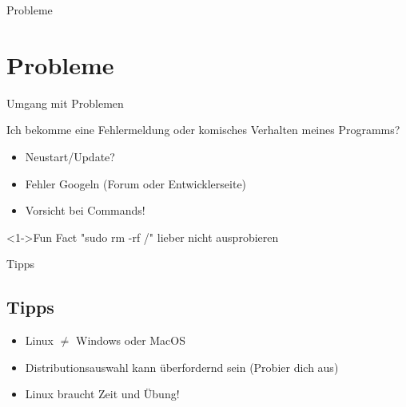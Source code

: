 
\begin{frame}{Probleme}
    \section{Probleme}\label{sec:probleme}

\end{frame}

\begin{frame}{Umgang mit Problemen}

    Ich bekomme eine Fehlermeldung oder komisches Verhalten meines Programms?

    \begin{itemize}
        \item<2-> Neustart/Update?
        \item<3-> Fehler Googeln (Forum oder Entwicklerseite)
        \item<4-> Vorsicht bei Commands!
    \end{itemize}

    \vspace{0.5cm}
    \begin{exampleblock}<1->{Fun Fact}
        "sudo rm -rf /" lieber nicht ausprobieren
    \end{exampleblock}

\end{frame}

\begin{frame}{Tipps}
    \subsection{Tipps}\label{subsec:tipps}

    \begin{itemize}
        \item {Linux $\neq$ Windows oder MacOS}\pause
        \item Distributionsauswahl kann überfordernd sein (Probier dich aus)\pause
        \item Linux braucht Zeit und Übung!
    \end{itemize}

\end{frame}

